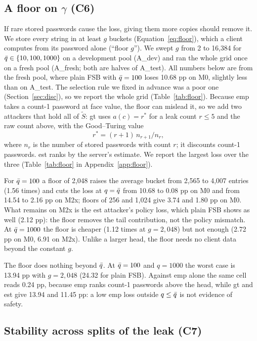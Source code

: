 \subsection{A floor on $\gamma$ (C6)}\label{sec:c6}

If rare stored passwords cause the loss, giving them more copies should remove it. We store every string in at least $g$ buckets (Equation~\eqref{eq:floor}), which a client computes from its password alone (``floor $g$''). We swept $g$ from 2 to 16,384 for $\bar q\in\{10,100,1000\}$ on a development pool (A\_dev) and ran the whole grid once on a fresh pool (A\_fresh; both are halves of A\_test). All numbers below are from the fresh pool, where plain FSB with $\bar q=100$ loses 10.68 pp on M0, slightly less than on A\_test. The selection rule we fixed in advance was a poor one (Section~\ref{sec:disc}), so we report the whole grid (Table~\ref{tab:floor}). Because emp takes a count-1 password at face value, the floor can mislead it, so we add two attackers that hold all of $\tilde S$: gt uses $a(c)=r^*$ for a leak count $r\le 5$ and the raw count above, with the Good--Turing value
\begin{equation}\label{eq:gt}
r^*=(r+1)\,n_{r+1}/n_r,
\end{equation}
where $n_r$ is the number of stored passwords with count $r$; it discounts count-1 passwords. est ranks by the server's estimate. We report the largest loss over the three (Table~\ref{tab:floor} in Appendix~\ref{app:floor}).

For $\bar q=100$ a floor of 2,048 raises the average bucket from 2,565 to 4,007 entries (1.56 times) and cuts the loss at $q=\bar q$ from 10.68 to 0.08 pp on M0 and from 14.54 to 2.16 pp on M2x; floors of 256 and 1,024 give 3.74 and 1.80 pp on M0. What remains on M2x is the est attacker's policy loss, which plain FSB shows as well (2.12 pp): the floor removes the tail contribution, not the policy mismatch. At $\bar q=1000$ the floor is cheaper (1.12 times at $g=2{,}048$) but not enough (2.72 pp on M0, 6.91 on M2x). Unlike a larger head, the floor needs no client data beyond the constant $g$.

The floor does nothing beyond $\bar q$. At $\bar q=100$ and $q=1000$ the worst case is 13.94 pp with $g=2{,}048$ (24.32 for plain FSB). Against emp alone the same cell reads 0.24 pp, because emp ranks count-1 passwords above the head, while gt and est give 13.94 and 11.45 pp: a low emp loss outside $q\le\bar q$ is not evidence of safety.

\subsection{Stability across splits of the leak (C7)}\label{sec:c7}

